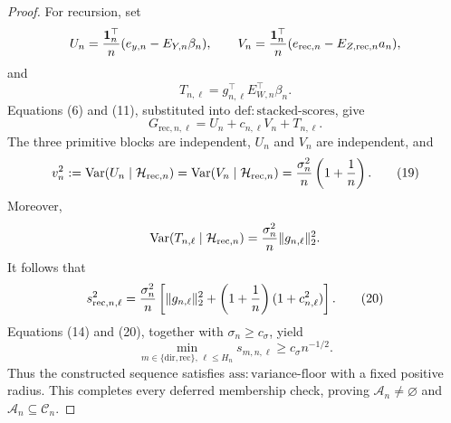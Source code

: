 \documentclass{article}
\begin{document}
\begin{proof}
For recursion, set
\[
 U_n={\boldsymbol 1_n^{\top}\over n}(e_{y,n}-E_{Y,n}\beta_n),
 \qquad
 V_n={\boldsymbol 1_n^{\top}\over n}(e_{\mathrm{rec},n}-E_{Z,\mathrm{rec},n}a_n),
\]
and
\[
 T_{n,\ell}=g_{n,\ell}^{\top}E_{W,n}^{\top}\beta_n.
\]
Equations (6) and (11), substituted into \(\mathrm{def{:}stacked\mbox{-}scores}\), give
\[
 G_{\mathrm{rec},n,\ell}=U_n+c_{n,\ell}V_n+T_{n,\ell}.
 \tag{18}
\]
The three primitive blocks are independent, \(U_n\) and \(V_n\) are independent, and
\[
 v_n^2:=\operatorname{Var}(U_n\mid\mathcal H_{\mathrm{rec},n})
 =\operatorname{Var}(V_n\mid\mathcal H_{\mathrm{rec},n})
 ={\sigma_n^2\over n}\left(1+{1\over n}\right).
 \tag{19}
\]
Moreover,
\[
 \operatorname{Var}(T_{n,\ell}\mid\mathcal H_{\mathrm{rec},n})
 ={\sigma_n^2\over n}\|g_{n,\ell}\|_2^2.
\]
It follows that
\[
 s_{\mathrm{rec},n,\ell}^2
 ={\sigma_n^2\over n}
 \left[\|g_{n,\ell}\|_2^2
   +\left(1+{1\over n}\right)(1+c_{n,\ell}^2)\right].
 \tag{20}
\]
Equations (14) and (20), together with \(\sigma_n\geq c_\sigma\), yield
\[
 \min_{m\in\{\mathrm{dir},\mathrm{rec}\},\,\ell\leq H_n}
 s_{m,n,\ell}\geq c_\sigma n^{-1/2}.
\]
Thus the constructed sequence satisfies \(\mathrm{ass{:}variance\mbox{-}floor}\) with a fixed positive radius.  This completes every deferred membership check, proving \(\mathcal A_n\neq\varnothing\) and \(\mathcal A_n\subseteq\mathcal C_n\).


\end{proof}
\end{document}
